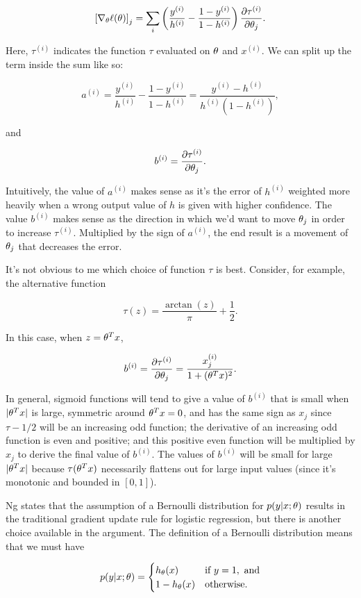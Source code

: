 \documentclass[]{article}
\begin{document}
\newcommand{\toi}{^{(i)}}

\[\left[\nabla_\th\ell(\th)\right]_j
= \sum_i\left(\frac{y\toi}{h\toi} - \frac{1-y\toi}{1-h\toi}\right)
\frac{\partial\tau\toi}{\partial\th_j}.\]

Here, \(\tau\toi\) indicates the function \(\tau\) evaluated on \(\theta\)
and \(x\toi\). We can split up the term inside the sum like so:

\[a\toi = 
\frac{y\toi}{h\toi} - \frac{1-y\toi}{1-h\toi}
= \frac{y\toi - h\toi}{h\toi(1-h\toi)},\]

and

\[b\toi = 
\frac{\partial\tau\toi}{\partial\th_j}.\]

Intuitively, the value of \(a\toi\) makes sense as it's the error of
\(h\toi\) weighted more heavily when a wrong output value of \(h\) is
given with higher confidence. The value \(b\toi\) makes sense as the
direction in which we'd want to move \(\theta_j\) in order to increase
\(\tau\toi\). Multiplied by the sign of \(a\toi\), the end result is a
movement of \(\theta_j\) that decreases the error.

It's not obvious to me which choice of function \(\tau\) is best.
Consider, for example, the alternative function

\[\tau(z) = \frac{\arctan(z)}{\pi} + \frac{1}{2}.\]

In this case, when \(z=\theta^Tx\),

\[b\toi
= \frac{\partial\tau\toi}{\partial\th_j} = \frac{x_j\toi}{1+(\th^Tx)^2}.\]

In general, sigmoid functions will tend to give a value of \(b\toi\)
that is small when \(|\theta^Tx|\) is large, symmetric around \(\theta^Tx=0\),
and has the same sign as \(x_j\) since \(\tau - 1/2\) will be an
increasing odd function; the derivative of an increasing odd function is
even and positive; and this positive even function will be multiplied by
\(x_j\) to derive the final value of \(b\toi.\) The values of \(b\toi\)
will be small for large \(|\theta^Tx|\) because \(\tau(\theta^Tx)\)
necessarily flattens out for large input values (since it's monotonic
and bounded in \([0,1]\)).

Ng states that the assumption of a Bernoulli distribution for
\(p(y|x;\theta)\) results in the traditional gradient update rule for
logistic regression, but there is another choice available in the
argument. The definition of a Bernoulli distribution means that we must
have

\[p(y|x;\theta) = \begin{cases}
h_\theta(x) & \text{if } y = 1, \text{ and} \\
1 - h_\theta(x) & \text{otherwise}.
\end{cases}\]
\end{document}
